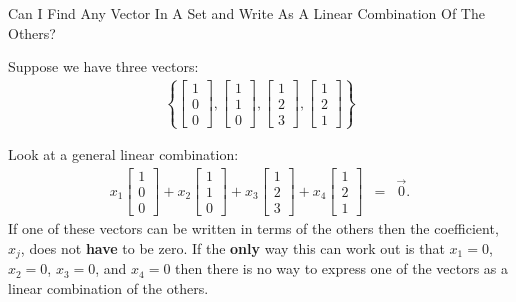 \documentclass[svgnames,table,,aspectratio=169]{beamer}
\newcommand{\columnVector}[1]{%
  \left[
    \begin{array}{r}
    #1                           
    \end{array}
  \right]
}
\begin{document}
\begin{frame}{Can I Find Any Vector In A Set and Write As A Linear
    Combination Of The Others?}

  Suppose we have three vectors:
  \begin{eqnarray*}
    \left\{
    \columnVector{1 \\ 0 \\ 0},
    \columnVector{1 \\ 1 \\ 0},
    \columnVector{1 \\ 2 \\ 3},
    \columnVector{1 \\ 2 \\ 1}
    \right\}
  \end{eqnarray*}

  Look at a general linear combination:
  \begin{eqnarray*}
    x_1 \columnVector{1 \\ 0 \\ 0} +
    x_2 \columnVector{1 \\ 1 \\ 0} +
    x_3 \columnVector{1 \\ 2 \\ 3} +
    x_4 \columnVector{1 \\ 2 \\ 1}
    & = &
    \vec{0}.
  \end{eqnarray*}
  If one of these vectors can be written in terms of the others then
  the coefficient, $x_j$, does not \textbf{have} to be zero. If the
  \textbf{only} way this can work out is that $x_1=0$, $x_2=0$,
  $x_3=0$, and $x_4=0$ then there is no way to express one of the
  vectors as a linear combination of the others.
  

\end{frame}
\end{document}
